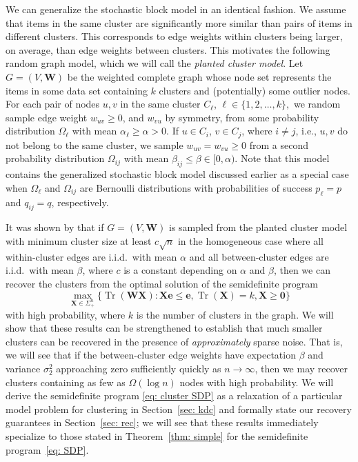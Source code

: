 \documentclass[twoside,11pt]{article}
\DeclareMathOperator{\tr}{{Tr}}
\newcommand{\e}{\bs {e}}
\newcommand{\bs}{\boldsymbol}
\newcommand{\X}{\bs {X}}
\newcommand{\W}{\bs {W}}
\newcommand{\0}{\bs{0}}
\newcommand{\ra}{\rightarrow}
\begin{document}
We can generalize %
the stochastic block model in an identical fashion.
We assume that items in the same cluster are significantly 
more similar than pairs of items in different clusters.
This corresponds to edge weights within clusters being larger, on average,
than edge weights between clusters.
This motivates the following random graph model, 
which we will call the \emph{planted cluster model}.
Let \(G = (V,\W)\) be the weighted complete graph whose node set
represents the items in some data set containing \(k\) clusters and (potentially)
some outlier nodes.
For each pair of nodes \(u,v \) in the same cluster $C_\ell$, 
$\ell \in \{1,2,\dots, k\},$
we random sample
edge weight \(w_{uv} \ge 0\), and \(w_{vu}\) by symmetry,
from some probability distribution \(\Omega_\ell\) 
with mean \(\alpha_\ell \ge \alpha > 0\). If \(u \in C_i\),
\(v \in C_j\), where $i \neq j$, i.e., $u,v$ do not belong to the same
cluster, we sample \(w_{uv} = w_{vu} \ge 0\) from a second probability distribution
\(\Omega_{ij}\) with mean \( \beta_{ij} \le \beta \in [0,\alpha) \).
Note that this model contains the generalized stochastic block model discussed
earlier as a special case when \(\Omega_\ell \) and \(\Omega_{ij}\) 
are Bernoulli distributions with probabilities of success 
\(p_\ell = p\) and \(q_{ij} = q\), respectively. 

It was shown by \cite{ames2014guaranteed} that if \(G = (V, \W)\) is sampled 
from the
planted cluster model
with minimum cluster
size at least \(c\sqrt{n}\) in the homogeneous
case where all within-cluster edges are i.i.d.~with mean $\alpha$
and all between-cluster edges are i.i.d.~with mean $\beta$, where \(c\) is a constant
depending on \(\alpha\) and \(\beta\), then we can recover the clusters 
from the optimal solution of the semidefinite program
\begin{equation} \label{eq: cluster SDP}
\max_{\X \in \Sigma_+^n} \Big\{ \tr(\W \X): \X \e \le \e,
\tr(\X) = k, \X \ge \0 \Big\}
\end{equation}
with high probability, where \(k \) is the number of clusters in the graph.
We will show that these results can be strengthened to establish that much
smaller clusters can be recovered in the presence of \emph{approximately}
sparse noise. That is, we will 
see that if the between-cluster edge weights have expectation
\(\beta\) and variance \(\sigma_2^2\) approaching zero  sufficiently quickly as \(n \ra \infty\), then we may recover
clusters containing as few as \(\Omega(\log n)\) nodes with high probability. %
We will derive the semidefinite program \eqref{eq: cluster SDP}
as a relaxation of a particular model problem for clustering in Section~\ref{sec: kdc}
and formally state our recovery guarantees  in Section~\ref{sec: rec};
we will see that these results immediately specialize to those stated in Theorem~\ref{thm: simple}
for the semidefinite program~\eqref{eq: SDP}.
\end{document}
